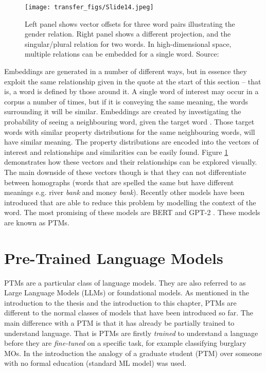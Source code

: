 \begin{figure}
  \texttt{[image: transfer\_figs/Slide14.jpeg]}
  \caption[Word Embeddings visual example]{Left panel shows vector offsets for three word pairs illustrating the gender relation. Right panel shows a different projection, and the singular/plural relation for two words. In high-dimensional space, multiple relations can be embedded for a single word. Source: \textcite{mikolov2013linguistic}}
  \label{fig:word}
\end{figure}

Embeddings are generated in a number of different ways, but in essence they exploit the same relationship given in the quote at the start of this section – that is, a word is defined by those around it. A single word of interest may occur in a corpus a number of times, but if it is conveying the same meaning, the words surrounding it will be similar. Embeddings are created by investigating the probability of seeing a neighbouring word, given the target word  \parencite{mikolov2013efficient}. Those target words with similar property distributions for the same neighbouring words, will have similar meaning. The property distributions are encoded into the vectors of interest and relationships and similarities can be easily found. Figure \ref{fig:word} demonstrates how these vectors and their relationships can be explored visually. The main downside of these vectors though is that they can not differentiate between homographs (words that are spelled the same but have different meanings e.g. river \emph{bank}  and money \emph{bank}). Recently other models have been introduced that are able to reduce this problem by modelling the context of the word. The most promising of these models are BERT \parencite{devlin2018bert} and GPT-2 \parencite{radford2019language}. These models are known as PTMs.


\section{Pre-Trained Language Models} PTMs are a particular class of language models. They are also referred to as Large Language Models (LLMs) or foundational models. As mentioned in the introduction to the thesis and the introduction to this chapter, PTMs are different to the normal classes of models that have been introduced so far. The main difference with a PTM is that it has already be partially trained to understand language. That is PTMs are firstly \emph{trained} to understand a language before they are \emph{fine-tuned} on a specific task, for example classifying burglary MOs. In the introduction the analogy of a graduate student (PTM) over someone with no formal education (standard ML model) was used. 

